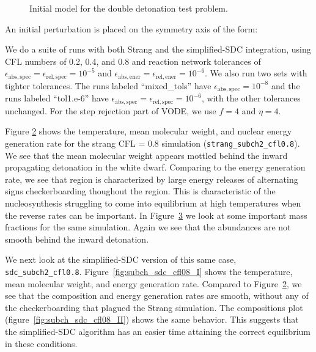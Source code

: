 \documentclass{aastex63}
\newcommand{\atolspec}{{\epsilon_\mathrm{abs,spec}}}
\newcommand{\rtolspec}{{\epsilon_\mathrm{rel,spec}}}
\newcommand{\atolener}{{\epsilon_\mathrm{abs,ener}}}
\newcommand{\rtolener}{{\epsilon_\mathrm{rel,ener}}}
\begin{document}
\begin{figure}[t]
\centering
{}
\caption{\label{fig:subch_initial_model} Initial model for the double detonation test problem.}
\end{figure}

An initial perturbation is placed on the symmetry axis of the form:


We do a suite of runs with both Strang and the simplified-SDC
integration, using CFL numbers of 0.2, 0.4, and 0.8 and reaction
network tolerances of $\atolspec = \rtolspec = 10^{-5}$ and $\atolener
= \rtolener = 10^{-6}$.  We also run two sets with tighter tolerances.
The runs labeled ``mixed\_tols'' have $\atolspec = 10^{-8}$ and the
runs labeled ``tol1.e-6'' have $\atolspec = \rtolspec = 10^{-6}$, with
the other tolerances unchanged.  For the step rejection part of VODE,
we use $f = 4$ and $\eta = 4$.

Figure \ref{fig:subch_strang_cfl08_I} shows the temperature, mean
molecular weight, and nuclear energy generation rate for the strang
CFL = 0.8 simulation ({\tt strang\_subch2\_cfl0.8}).  We see that the
mean molecular weight appears mottled behind the inward propagating
detonation in the white dwarf.  Comparing to the energy generation
rate, we see that region is characterized by large energy releases of
alternating signs checkerboarding thoughout the region.  This is
characteristic of the nucleosynthesis struggling to come into
equilibrium at high temperatures when the reverse rates can be
important.  In Figure~\ref{fig:subch_strang_cfl08_II} we look at some
important mass fractions for the same simulation.  Again we see that
the abundances are not smooth behind the inward detonation.

\begin{figure}
\centering
{}
\caption{\label{fig:subch_strang_cfl08_I}}
\end{figure}

\begin{figure}
\centering
{}
\caption{\label{fig:subch_strang_cfl08_II}}
\end{figure}

We next look at the simplified-SDC version of this same case, {\tt
  sdc\_subch2\_cfl0.8}.  Figure~\ref{fig:subch_sdc_cfl08_I} shows the
temperature, mean molecular weight, and energy generation rate.
Compared to Figure~\ref{fig:subch_strang_cfl08_I}, we see that the
composition and energy generation rates are smooth, without any of the
checkerboarding that plagued the Strang simulation.  The compositions
plot (figure~\ref{fig:subch_sdc_cfl08_II}) shows the same behavior.
This suggests that the simplified-SDC algorithm has an easier time
attaining the correct equilibrium in these conditions.
\end{document}
